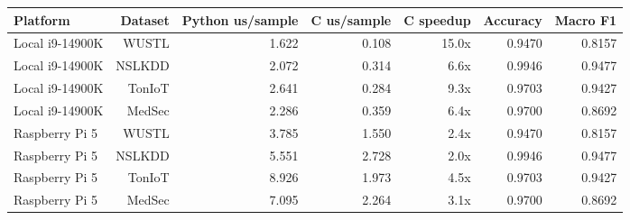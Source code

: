 \begin{tabular}{lrrrrrr}
\toprule
Platform & Dataset & Python us/sample & C us/sample & C speedup & Accuracy & Macro F1 \\
\midrule
Local i9-14900K & WUSTL & 1.622 & 0.108 & 15.0x & 0.9470 & 0.8157 \\
Local i9-14900K & NSLKDD & 2.072 & 0.314 & 6.6x & 0.9946 & 0.9477 \\
Local i9-14900K & TonIoT & 2.641 & 0.284 & 9.3x & 0.9703 & 0.9427 \\
Local i9-14900K & MedSec & 2.286 & 0.359 & 6.4x & 0.9700 & 0.8692 \\
Raspberry Pi 5 & WUSTL & 3.785 & 1.550 & 2.4x & 0.9470 & 0.8157 \\
Raspberry Pi 5 & NSLKDD & 5.551 & 2.728 & 2.0x & 0.9946 & 0.9477 \\
Raspberry Pi 5 & TonIoT & 8.926 & 1.973 & 4.5x & 0.9703 & 0.9427 \\
Raspberry Pi 5 & MedSec & 7.095 & 2.264 & 3.1x & 0.9700 & 0.8692 \\
\bottomrule
\end{tabular}
